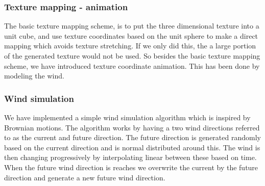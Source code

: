 \subsubsection{Texture mapping - animation}
The basic texture mapping scheme, is to put the three dimensional
texture into a unit cube, and use texture coordinates based on the
unit sphere to make a direct mapping which avoids texture stretching.
%
If we only did this, the a large portion of the generated texture
would not be used.
%
So besides the basic texture mapping scheme, we have introduced
texture coordinate animation. This has been done by modeling the wind.

\subsubsection{Wind simulation}
We have implemented a simple wind simulation algorithm which is
inspired by Brownian motions. \citebook{}{}
The algorithm works by having a two wind directions referred to as the
current and future direction. The future direction is generated
randomly based on the current direction and is normal distributed
around this. The wind is then changing progressively by interpolating
linear between these based on time. When the future wind direction is
reaches we overwrite the current by the future direction and generate
a new future wind direction.



